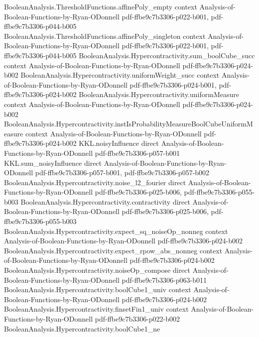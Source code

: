 \begin{theorem}
\proofstep
  {BooleanAnalysis.ThresholdFunctions.affinePoly_empty}
  {context}
  {Analysis-of-Boolean-Functions-by-Ryan-ODonnell}
  {pdf-ffbe9c7b3306-p022-b001,
    pdf-ffbe9c7b3306-p044-b005}
\proofstep
  {BooleanAnalysis.ThresholdFunctions.affinePoly_singleton}
  {context}
  {Analysis-of-Boolean-Functions-by-Ryan-ODonnell}
  {pdf-ffbe9c7b3306-p022-b001,
    pdf-ffbe9c7b3306-p044-b005}
\proofstep
  {BooleanAnalysis.Hypercontractivity.sum_boolCube_succ}
  {context}
  {Analysis-of-Boolean-Functions-by-Ryan-ODonnell}
  {pdf-ffbe9c7b3306-p024-b002}
\proofstep
  {BooleanAnalysis.Hypercontractivity.uniformWeight_succ}
  {context}
  {Analysis-of-Boolean-Functions-by-Ryan-ODonnell}
  {pdf-ffbe9c7b3306-p024-b001,
    pdf-ffbe9c7b3306-p024-b002}
\proofstep
  {BooleanAnalysis.Hypercontractivity.uniformMeasure}
  {context}
  {Analysis-of-Boolean-Functions-by-Ryan-ODonnell}
  {pdf-ffbe9c7b3306-p024-b002}
\proofstep
  {BooleanAnalysis.Hypercontractivity.instIsProbabilityMeasureBoolCubeUniformMeasure}
  {context}
  {Analysis-of-Boolean-Functions-by-Ryan-ODonnell}
  {pdf-ffbe9c7b3306-p024-b002}
\proofstep
  {KKL.noisyInfluence}
  {direct}
  {Analysis-of-Boolean-Functions-by-Ryan-ODonnell}
  {pdf-ffbe9c7b3306-p057-b001}
\proofstep
  {KKL.sum_noisyInfluence}
  {direct}
  {Analysis-of-Boolean-Functions-by-Ryan-ODonnell}
  {pdf-ffbe9c7b3306-p057-b001,
    pdf-ffbe9c7b3306-p057-b002}
\proofstep
  {BooleanAnalysis.Hypercontractivity.noise_l2_fourier}
  {direct}
  {Analysis-of-Boolean-Functions-by-Ryan-ODonnell}
  {pdf-ffbe9c7b3306-p025-b006,
    pdf-ffbe9c7b3306-p055-b003}
\proofstep
  {BooleanAnalysis.Hypercontractivity.contractivity}
  {direct}
  {Analysis-of-Boolean-Functions-by-Ryan-ODonnell}
  {pdf-ffbe9c7b3306-p025-b006,
    pdf-ffbe9c7b3306-p055-b003}
\proofstep
  {BooleanAnalysis.Hypercontractivity.expect_sq_noiseOp_nonneg}
  {context}
  {Analysis-of-Boolean-Functions-by-Ryan-ODonnell}
  {pdf-ffbe9c7b3306-p024-b002}
\proofstep
  {BooleanAnalysis.Hypercontractivity.expect_rpow_abs_nonneg}
  {context}
  {Analysis-of-Boolean-Functions-by-Ryan-ODonnell}
  {pdf-ffbe9c7b3306-p024-b002}
\proofstep
  {BooleanAnalysis.Hypercontractivity.noiseOp_compose}
  {direct}
  {Analysis-of-Boolean-Functions-by-Ryan-ODonnell}
  {pdf-ffbe9c7b3306-p063-b011}
\proofstep
  {BooleanAnalysis.Hypercontractivity.boolCube1_univ}
  {context}
  {Analysis-of-Boolean-Functions-by-Ryan-ODonnell}
  {pdf-ffbe9c7b3306-p024-b002}
\proofstep
  {BooleanAnalysis.Hypercontractivity.finsetFin1_univ}
  {context}
  {Analysis-of-Boolean-Functions-by-Ryan-ODonnell}
  {pdf-ffbe9c7b3306-p022-b002}
\proofstep
  {BooleanAnalysis.Hypercontractivity.boolCube1_ne}

\end{theorem}
